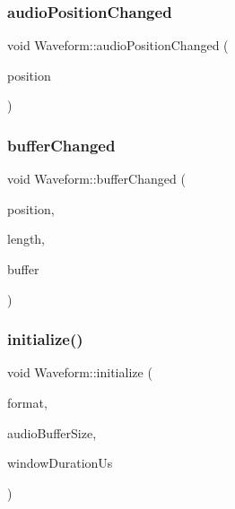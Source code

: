 \subsubsection{\texorpdfstring{audio\+Position\+Changed}{audioPositionChanged}}
{\footnotesize\ttfamily void Waveform\+::audio\+Position\+Changed (\begin{DoxyParamCaption}\item[{qint64}]{position }\end{DoxyParamCaption})\hspace{0.3cm}{\ttfamily [slot]}}

\hypertarget{class_waveform_ae4dc908754aa8290280b60b14af11728}{}\label{class_waveform_ae4dc908754aa8290280b60b14af11728} 
\subsubsection{\texorpdfstring{buffer\+Changed}{bufferChanged}}
{\footnotesize\ttfamily void Waveform\+::buffer\+Changed (\begin{DoxyParamCaption}\item[{qint64}]{position,  }\item[{qint64}]{length,  }\item[{const Q\+Byte\+Array \&}]{buffer }\end{DoxyParamCaption})\hspace{0.3cm}{\ttfamily [slot]}}

\hypertarget{class_waveform_a0abffebbd2efcd6047137095f99a97f1}{}\label{class_waveform_a0abffebbd2efcd6047137095f99a97f1} 
\subsubsection{\texorpdfstring{initialize()}{initialize()}}
{\footnotesize\ttfamily void Waveform\+::initialize (\begin{DoxyParamCaption}\item[{const Q\+Audio\+Format \&}]{format,  }\item[{qint64}]{audio\+Buffer\+Size,  }\item[{qint64}]{window\+Duration\+Us }\end{DoxyParamCaption})}

\hypertarget{class_waveform_a0c3a57dd99d9d203c1bfd846d639939f}{}\label{class_waveform_a0c3a57dd99d9d203c1bfd846d639939f} 
